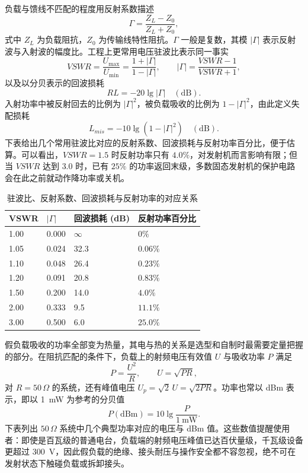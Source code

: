 负载与馈线不匹配的程度用反射系数描述
\[
\Gamma = \frac{Z_L - Z_0}{Z_L + Z_0},
\]
式中 $Z_L$ 为负载阻抗，$Z_0$ 为传输线特性阻抗。$\Gamma$ 一般是复数，其模 $|\Gamma|$ 表示反射波与入射波的幅度比。工程上更常用电压驻波比表示同一事实
\[
VSWR = \frac{U_{\max}}{U_{\min}} = \frac{1 + |\Gamma|}{1 - |\Gamma|},
\qquad |\Gamma| = \frac{VSWR - 1}{VSWR + 1},
\]
以及以分贝表示的回波损耗
\[
RL = -20\lg|\Gamma| \quad (\mathrm{dB}).
\]
入射功率中被反射回去的比例为 $|\Gamma|^2$，被负载吸收的比例为 $1 - |\Gamma|^2$，由此定义失配损耗
\[
L_{mis} = -10\lg\left(1 - |\Gamma|^{2}\right) \quad (\mathrm{dB}).
\]
下表给出几个常用驻波比对应的反射系数、回波损耗与反射功率百分比，便于估算。可以看出，$VSWR = 1.5$ 时反射功率只有 $4.0\%$，对发射机而言影响有限；但当 $VSWR$ 达到 $3.0$ 时，已有 $25\%$ 的功率返回末级，多数固态发射机的保护电路会在此之前就动作降功率或关机。

\begin{table}[htbp]
\centering
\caption{驻波比、反射系数、回波损耗与反射功率的对应关系}
\begin{tabular}{|p{2.2cm}|p{2.6cm}|p{3.0cm}|p{3.4cm}|}
\hline
\textbf{VSWR} & \textbf{$|\Gamma|$} & \textbf{回波损耗 (dB)} & \textbf{反射功率百分比} \\
\hline
1.00 & 0.000 & $\infty$ & $0\%$ \\
\hline
1.05 & 0.024 & 32.3 & $0.06\%$ \\
\hline
1.10 & 0.048 & 26.4 & $0.23\%$ \\
\hline
1.20 & 0.091 & 20.8 & $0.83\%$ \\
\hline
1.50 & 0.200 & 14.0 & $4.0\%$ \\
\hline
2.00 & 0.333 & 9.5 & $11.1\%$ \\
\hline
3.00 & 0.500 & 6.0 & $25.0\%$ \\
\hline
\end{tabular}
\end{table}

假负载吸收的功率全部变为热量，其电与热的关系是选型和自制时最需要定量把握的部分。在阻抗匹配的条件下，负载上的射频电压有效值 $U$ 与吸收功率 $P$ 满足
\[
P = \frac{U^2}{R}, \qquad U = \sqrt{P R},
\]
对 $R = 50\,\Omega$ 的系统，还有峰值电压 $U_p = \sqrt{2}\,U = \sqrt{2PR}$。功率也常以 dBm 表示，即以 1~mW 为参考的分贝值
\[
P(\mathrm{dBm}) = 10\lg\frac{P}{1\ \mathrm{mW}} .
\]
下表列出 $50\,\Omega$ 系统中几个典型功率对应的电压与 dBm 值。这些数值提醒使用者：即使是百瓦级的普通电台，负载端的射频电压峰值已达百伏量级，千瓦级设备更超过 300~V，因此假负载的绝缘、接头耐压与操作安全都不容忽视，绝不可在发射状态下触碰负载或拆卸接头。

